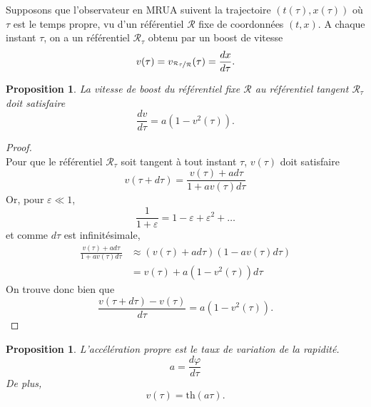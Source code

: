 \documentclass[a4paper,11pt]{report}
\theoremstyle{definition}
\theoremstyle{plain}
\newtheorem{prop}[thm]{Proposition}
\theoremstyle{definition}
\theoremstyle{remark}
\renewcommand{\th}[1]{\text{th}(#1)}
\newcommand{\R}{\mathcal{R}}
\begin{document}
            Supposons que l'observateur en MRUA suivent la trajectoire $(t(\tau),x(\tau))$ où $\tau$ est le temps propre, vu d'un référentiel $\mathcal{R}$ fixe de coordonnées $(t,x)$. A chaque instant $\tau$, on a un référentiel $\mathcal{R}_{\tau}$ obtenu par un boost de vitesse
            \begin{equation}
                v(\tau) = v_{\nicefrac{\R_\tau}{\R}}(\tau) = \frac{dx}{d\tau}.
            \end{equation}
            
            \begin{prop}\label{prop:v}
                La vitesse de boost du référentiel fixe $\R$ au référentiel tangent $\R_\tau$ doit satisfaire
                \begin{equation}
                    \frac{dv}{d\tau} = a\left(1-v^2(\tau)\right).
                \end{equation}
            \end{prop}
            
            \begin{proof}
            ${}$\\
                Pour que le référentiel $\R_\tau$ soit tangent à tout instant $\tau$, $v(\tau)$ doit satisfaire
            \begin{equation}
                v(\tau+d\tau) = \frac{v(\tau)+ad\tau}{1+av(\tau)d\tau}
            \end{equation}
            Or, pour $\varepsilon\ll 1$,
            \begin{equation}
                \frac{1}{1+\varepsilon} = 1-\varepsilon+\varepsilon^2+\dots
            \end{equation}
            et comme $d\tau$ est infinitésimale,
            \begin{align}
                \frac{v(\tau)+ad\tau}{1+av(\tau)d\tau} &\approx \left(v(\tau)+ad\tau\right)\left( 1-av(\tau)d\tau \right) \\
                &= v(\tau) + a\left( 1-v^2(\tau) \right)d\tau
            \end{align}
            On trouve donc bien que 
            \begin{equation}
                \frac{v(\tau+d\tau)-v(\tau)}{d\tau} = a\left( 1-v^2(\tau) \right).
            \end{equation}
            \end{proof}
            
            \begin{prop}
                L'accélération propre est le taux de variation de la rapidité.
                \begin{equation}
                    a = \frac{d\varphi}{d\tau}
                \end{equation}
                De plus,
                \begin{equation}
                    v(\tau) = \th{a\tau}.
                \end{equation}
            \end{prop}
            
\end{document}
